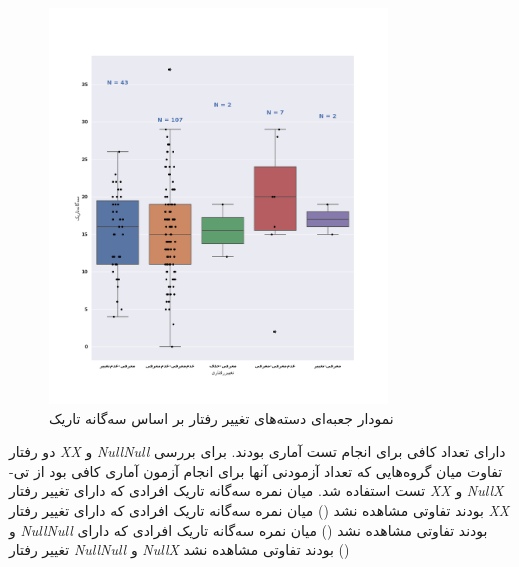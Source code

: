 \begin{figure}[htpb]
    \centering
    \includegraphics[width=0.8\textwidth]{./img/SelectedBehaviorsBoxPlot.png}
    \caption{نمودار جعبه‌ای دسته‌های تغییر رفتار بر اساس سه‌گانه تاریک}
    \label{fig:BehavioralChange_DarkTriad_Boxplot}
\end{figure}

دو رفتار 
\textit{\gls{XX}}
و
\textit{\gls{NullNull}}
دارای تعداد کافی برای انجام تست آماری بودند. 
برای بررسی تفاوت میان گروه‌هایی که تعداد آزمودنی آنها برای انجام آزمون آماری کافی بود از تی-تست استفاده شد.
میان نمره سه‌گانه تاریک افرادی که دارای تغییر رفتار
\textit{\gls{XX}}
و
\textit{\gls{NullX}}
بودند تفاوتی مشاهده نشد
(\XYNullDarkTriadXXXYNullDarkTriadNullXTTestPValueReport)
میان نمره سه‌گانه تاریک افرادی که دارای تغییر رفتار
\textit{\gls{XX}}
و
\textit{\gls{NullNull}}
بودند تفاوتی مشاهده نشد
(\XYNullDarkTriadXXXYNullDarkTriadNullNullTTestPValueReport)
میان نمره سه‌گانه تاریک افرادی که دارای تغییر رفتار
\textit{\gls{NullNull}}
و
\textit{\gls{NullX}}
بودند تفاوتی مشاهده نشد
(\XYNullDarkTriadNullXXYNullDarkTriadNullNullTTestPValueReport)







